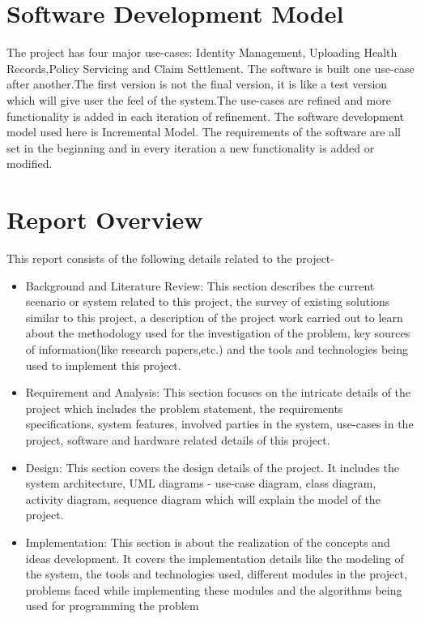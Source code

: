 \section{Software Development Model}
The project has four major use-cases: Identity Management, Uploading Health Records,Policy Servicing and Claim Settlement. The software is built one use-case after another.The first version is not the final version, it is like a test version which will give user the feel of the system.The use-cases are refined and more functionality is added in each iteration of refinement. The software development model used here is Incremental Model. The requirements of the software are all set in the beginning and in every iteration a new functionality is added or modified.
    
\section{Report Overview}
This report consists of the following details related to the project-
\begin{itemize}
	\item Background and Literature Review: This section describes the current scenario or system related to this project, the survey of existing solutions similar to this project, a description of the project work carried out to learn about the methodology used for the investigation of the problem, key sources of information(like research papers,etc.) and the tools and technologies being used to implement this project.
	\item 	Requirement and Analysis: This section focuses on the intricate details of the project which includes the problem statement, the requirements specifications, system features, involved parties in the system, use-cases in the project, software and hardware related details of this project.
	\item  Design: This section covers the design details of the project. It includes the system architecture, UML diagrams - use-case diagram, class diagram, activity diagram, sequence diagram which will explain the model of the project.
	\item Implementation: This section is about the realization of the concepts and ideas development. It covers the implementation details like the modeling of the system, the tools and technologies used, different modules in the project, problems faced while implementing these modules and the algorithms being used for programming the problem
\end{itemize}

	